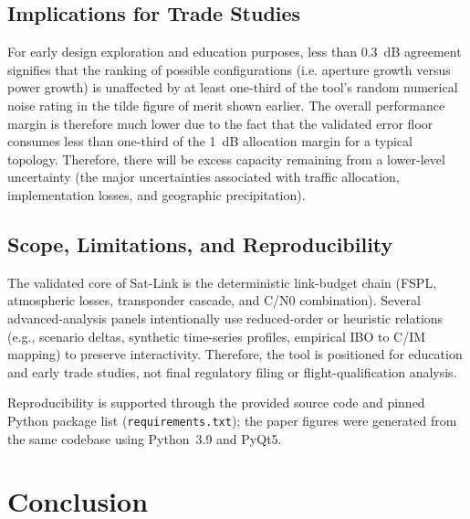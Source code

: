 \documentclass[conference]{IEEEtran}
\begin{document}
\subsection{Implications for Trade Studies}

For early design exploration and education purposes, less than 
0.3~dB agreement signifies that the ranking of possible 
configurations (i.e. aperture growth versus power growth) is 
unaffected by at least one-third of the tool's random numerical 
noise rating in the tilde figure of merit shown earlier. The overall 
performance margin is therefore much lower due to the fact that 
the validated error floor consumes less than one-third of the 
1~dB allocation margin for a typical topology. Therefore, there 
will be excess capacity remaining from a lower-level uncertainty 
(the major uncertainties associated with traffic allocation, 
implementation losses, and geographic precipitation).

\subsection{Scope, Limitations, and Reproducibility}

The validated core of Sat-Link is the deterministic link-budget chain
(FSPL, atmospheric losses, transponder cascade, and C/N0 combination).
Several advanced-analysis panels intentionally use reduced-order or
heuristic relations (e.g., scenario deltas, synthetic time-series
profiles, empirical IBO to C/IM mapping) to preserve interactivity.
Therefore, the tool is positioned for education and early trade studies,
not final regulatory filing or flight-qualification analysis.

Reproducibility is supported through the provided source code and pinned
Python package list (\texttt{requirements.txt}); the paper figures were
generated from the same codebase using Python~3.9 and PyQt5.


\section{Conclusion}
\label{sec:conclusion}
\end{document}
